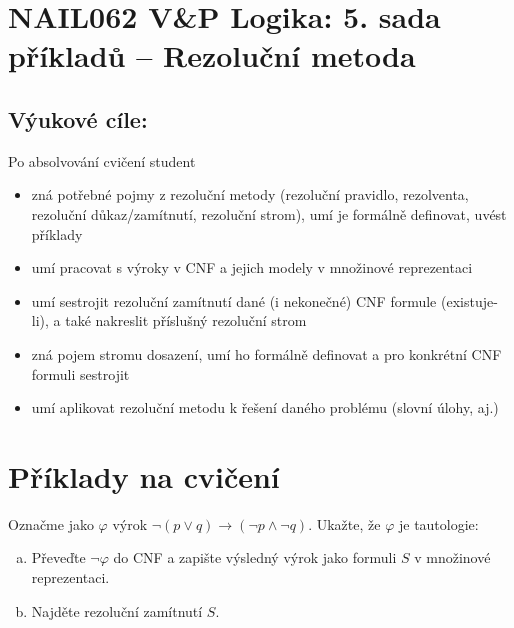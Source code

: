 \section*{NAIL062 V\&P Logika: 5. sada příkladů -- Rezoluční metoda}


\subsection*{Výukové cíle:} Po absolvování cvičení student

    \begin{itemize}\setlength{\itemsep}{0pt}
        \item zná potřebné pojmy z rezoluční metody (rezoluční pravidlo, rezolventa, rezoluční důkaz/zamítnutí, rezoluční strom), umí je formálně definovat, uvést příklady
        \item umí pracovat s výroky v CNF a jejich modely v množinové reprezentaci
        \item umí sestrojit rezoluční zamítnutí dané (i nekonečné) CNF formule (existuje-li), a také nakreslit příslušný rezoluční strom
        \item zná pojem stromu dosazení, umí ho formálně definovat a pro konkrétní CNF formuli sestrojit
        \item umí aplikovat rezoluční metodu k řešení daného problému (slovní úlohy, aj.)
    \end{itemize}
    

\section*{Příklady na cvičení}


\begin{problem}

    Označme jako $\varphi$ výrok $\neg (p \vee q) \to (\neg p \wedge \neg q)$. Ukažte, že $\varphi$ je tautologie:
    \begin{enumerate}[(a)]
        \item Převeďte $\neg \varphi$ do CNF a zapište výsledný výrok jako formuli $S$ v množinové reprezentaci.
        \item Najděte rezoluční zamítnutí $S$.
    \end{enumerate}

    \begin{solution}
                    
    \end{solution}

\end{problem}


